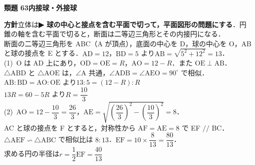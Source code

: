 \documentclass[a4paper,11pt]{ltjsarticle}
\newcommand{\ans}[2]{\Needspace{5\baselineskip}\vspace{6pt}%
  {\sffamily\bfseries 類題 #1\quad #2}\par}
\newcommand{\point}[1]{\textsf{\bfseries ▶ #1}}
\begin{document}
\ans{63}{内接球・外接球}
\begin{kai}
\textbf{方針}\quad 立体は\point{球の中心と接点を含む平面で切って，平面図形の問題にする}．円錐の軸を含む平面で切ると，断面は二等辺三角形とその内接円になる．\\[2pt]
断面の二等辺三角形を ABC（A が頂点），底面の中心を D，球の中心を O，AB と球の接点を E とする．$\mathrm{AD}=12$，$\mathrm{BD}=5$ より\quad $\mathrm{AB}=\sqrt{5^2+12^2}=13$．\\
(1)\ O は AD 上にあり，$\mathrm{OD}=\mathrm{OE}=R$，$\mathrm{AO}=12-R$．また $\mathrm{OE}\perp\mathrm{AB}$．\\
\hspace*{1.5em}$\triangle\mathrm{ABD}$ と $\triangle\mathrm{AOE}$ は，$\angle\mathrm A$ 共通，$\angle\mathrm{ADB}=\angle\mathrm{AEO}=90^\circ$ で相似．\\
\hspace*{1.5em}$\mathrm{AB}:\mathrm{BD}=\mathrm{AO}:\mathrm{OE}$ より\quad $13:5=(12-R):R$\\
\hspace*{1.5em}$13R=60-5R$ より\quad $R=\dfrac{10}{3}$\\[2pt]
(2)\ $\mathrm{AO}=12-\dfrac{10}3=\dfrac{26}3$，\quad $\mathrm{AE}=\sqrt{\left(\dfrac{26}3\right)^2-\left(\dfrac{10}3\right)^2}=8$．\\
\hspace*{1.5em}AC と球の接点を F とすると，対称性から $\mathrm{AF}=\mathrm{AE}=8$ で EF $/\!/$ BC．\\
\hspace*{1.5em}$\triangle\mathrm{AEF}\backsim\triangle\mathrm{ABC}$ で相似比は $8:13$．$\mathrm{EF}=10\times\dfrac{8}{13}=\dfrac{80}{13}$．\\
\hspace*{1.5em}求める円の半径は\quad $r=\dfrac12\mathrm{EF}=\dfrac{40}{13}$
\end{kai}
\end{document}
